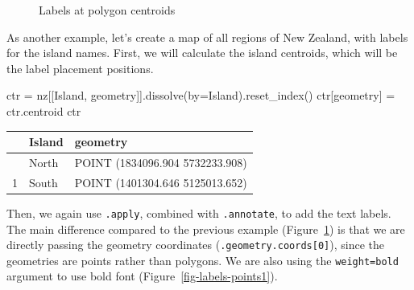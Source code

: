 \documentclass[
  letterpaper,
]{krantz}
\newenvironment{Shaded}{\begin{snugshade}}{\end{snugshade}}
\newcommand{\NormalTok}[1]{\textcolor[rgb]{0.00,0.23,0.31}{#1}}
\newcommand{\OperatorTok}[1]{\textcolor[rgb]{0.37,0.37,0.37}{#1}}
\newcommand{\StringTok}[1]{\textcolor[rgb]{0.13,0.47,0.30}{#1}}
\begin{document}
\begin{figure}[H]


\caption{\label{fig-labels-polygon}Labels at polygon centroids}

\end{figure}%

As another example, let's create a map of all regions of New Zealand,
with labels for the island names. First, we will calculate the island
centroids, which will be the label placement positions.

\begin{Shaded}
\begin{Highlighting}[]
\NormalTok{ctr }\OperatorTok{=}\NormalTok{ nz[[}\StringTok{\textquotesingle{}Island\textquotesingle{}}\NormalTok{, }\StringTok{\textquotesingle{}geometry\textquotesingle{}}\NormalTok{]].dissolve(by}\OperatorTok{=}\StringTok{\textquotesingle{}Island\textquotesingle{}}\NormalTok{).reset\_index()}
\NormalTok{ctr[}\StringTok{\textquotesingle{}geometry\textquotesingle{}}\NormalTok{] }\OperatorTok{=}\NormalTok{ ctr.centroid}
\NormalTok{ctr}
\end{Highlighting}
\end{Shaded}

\begin{longtable}[]{@{}lll@{}}
\toprule\noalign{}
& Island & geometry \\
\midrule\noalign{}
\endhead
\bottomrule\noalign{}
\endlastfoot
0 & North & POINT (1834096.904 5732233.908) \\
1 & South & POINT (1401304.646 5125013.652) \\
\end{longtable}

Then, we again use \texttt{.apply}, combined with \texttt{.annotate}, to
add the text labels. The main difference compared to the previous
example (Figure~\ref{fig-labels-polygon}) is that we are directly
passing the geometry coordinates (\texttt{.geometry.coords{[}0{]}}),
since the geometries are points rather than polygons. We are also using
the \texttt{weight=\textquotesingle{}bold\textquotesingle{}} argument to
use bold font (Figure~\ref{fig-labels-points1}).
\end{document}
